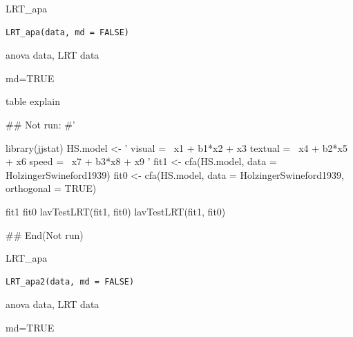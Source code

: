 \documentclass[a4paper]{book}
\begin{document}
%
\begin{Description}
LRT\_apa
\end{Description}
%
\begin{Usage}
\begin{verbatim}
LRT_apa(data, md = FALSE)
\end{verbatim}
\end{Usage}
%
\begin{Arguments}
\begin{ldescription}
\item[\code{data}] anova data, LRT data

\item[\code{md}] md=TRUE
\end{ldescription}
\end{Arguments}
%
\begin{Value}
table explain
\end{Value}
%
\begin{Examples}
\begin{ExampleCode}

\#\# Not run: 
#'

library(jjstat)
HS.model <- '
    visual  =~ x1 + b1*x2 + x3
    textual =~ x4 + b2*x5 + x6
    speed   =~ x7 + b3*x8 + x9
'
fit1 <- cfa(HS.model, data = HolzingerSwineford1939)
fit0 <- cfa(HS.model, data = HolzingerSwineford1939,
            orthogonal = TRUE)

fit1 %
fit0 %
lavTestLRT(fit1, fit0)
lavTestLRT(fit1, fit0) %

## End(Not run)


\end{ExampleCode}
\end{Examples}
%
\begin{Description}
LRT\_apa
\end{Description}
%
\begin{Usage}
\begin{verbatim}
LRT_apa2(data, md = FALSE)
\end{verbatim}
\end{Usage}
%
\begin{Arguments}
\begin{ldescription}
\item[\code{data}] anova data, LRT data

\item[\code{md}] md=TRUE
\end{ldescription}
\end{Arguments}
\end{document}
